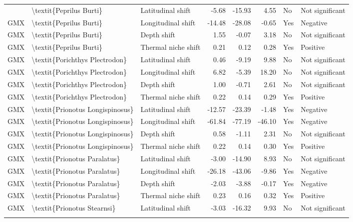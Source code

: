 \begin{longtable}[t]{lllrrrll}
{{GMX & \textbackslash{}textit\{Peprilus Burti\} & Latitudinal shift & -5.68 & -15.93 & 4.55 & No & Not significant\\
GMX & \textbackslash{}textit\{Peprilus Burti\} & Longitudinal shift & -14.48 & -28.08 & -0.65 & Yes & Negative\\
\addlinespace
GMX & \textbackslash{}textit\{Peprilus Burti\} & Depth shift & 1.55 & -0.07 & 3.18 & No & Not significant\\
GMX & \textbackslash{}textit\{Peprilus Burti\} & Thermal niche shift & 0.21 & 0.12 & 0.28 & Yes & Positive\\
GMX & \textbackslash{}textit\{Porichthys Plectrodon\} & Latitudinal shift & 0.46 & -9.19 & 9.88 & No & Not significant\\
GMX & \textbackslash{}textit\{Porichthys Plectrodon\} & Longitudinal shift & 6.82 & -5.39 & 18.20 & No & Not significant\\
GMX & \textbackslash{}textit\{Porichthys Plectrodon\} & Depth shift & 1.00 & -0.71 & 2.61 & No & Not significant\\
\addlinespace
GMX & \textbackslash{}textit\{Porichthys Plectrodon\} & Thermal niche shift & 0.22 & 0.14 & 0.29 & Yes & Positive\\
GMX & \textbackslash{}textit\{Prionotus Longispinosus\} & Latitudinal shift & -12.57 & -23.39 & -1.48 & Yes & Negative\\
GMX & \textbackslash{}textit\{Prionotus Longispinosus\} & Longitudinal shift & -61.84 & -77.19 & -46.10 & Yes & Negative\\
GMX & \textbackslash{}textit\{Prionotus Longispinosus\} & Depth shift & 0.58 & -1.11 & 2.31 & No & Not significant\\
GMX & \textbackslash{}textit\{Prionotus Longispinosus\} & Thermal niche shift & 0.22 & 0.14 & 0.30 & Yes & Positive\\
\addlinespace
GMX & \textbackslash{}textit\{Prionotus Paralatus\} & Latitudinal shift & -3.00 & -14.90 & 8.93 & No & Not significant\\
GMX & \textbackslash{}textit\{Prionotus Paralatus\} & Longitudinal shift & -26.18 & -43.06 & -9.86 & Yes & Negative\\
GMX & \textbackslash{}textit\{Prionotus Paralatus\} & Depth shift & -2.03 & -3.88 & -0.17 & Yes & Negative\\
GMX & \textbackslash{}textit\{Prionotus Paralatus\} & Thermal niche shift & 0.23 & 0.16 & 0.32 & Yes & Positive\\
GMX & \textbackslash{}textit\{Prionotus Stearnsi\} & Latitudinal shift & -3.03 & -16.32 & 9.93 & No & Not significant\\
}}
\end{longtable}
